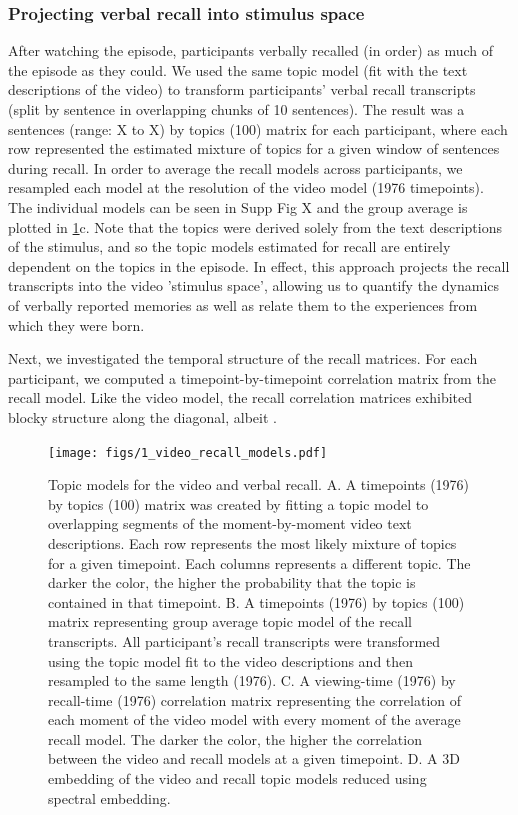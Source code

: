 \documentclass[a4paper,man,natbib,floatsintext]{apa6}
\begin{document}
\subsubsection{Projecting verbal recall into stimulus space}
After watching the episode, participants verbally recalled (in order) as much of the episode as they could.  We used the same topic model (fit with the text descriptions of the video) to transform participants' verbal recall transcripts (split by sentence in overlapping chunks of 10 sentences). The result was a sentences (range: X to X) by topics (100) matrix for each participant, where each row represented the estimated mixture of topics for a given window of sentences during recall. In order to average the recall models across participants, we resampled each model at the resolution of the video model (1976 timepoints). The individual models can be seen in Supp Fig X and the group average is plotted in \ref{fig:model}c. Note that the topics were derived solely from the text descriptions of the stimulus, and so the topic models estimated for recall are entirely dependent on the topics in the episode. In effect, this approach projects the recall transcripts into the video 'stimulus space', allowing us to quantify the dynamics of verbally reported memories as well as relate them to the experiences from which they were born.

Next, we investigated the temporal structure of the recall matrices. For each participant, we computed a timepoint-by-timepoint correlation matrix from the recall model. Like the video model, the recall correlation matrices exhibited blocky structure along the diagonal, albeit .

\begin{figure}[t!]
\centering
\texttt{[image: figs/1\_video\_recall\_models.pdf]}
\caption{\label{fig:model}Topic models for the video and verbal recall. A. A timepoints (1976) by topics (100) matrix was created by fitting a topic model to overlapping segments of the moment-by-moment video text descriptions.  Each row represents the most likely mixture of topics for a given timepoint. Each columns represents a different topic. The darker the color, the higher the probability that the topic is contained in that timepoint. B. A timepoints (1976) by topics (100) matrix representing group average topic model of the recall transcripts.  All participant's recall transcripts were transformed using the topic model fit to the video descriptions and then resampled to the same length (1976). C. A viewing-time (1976) by recall-time (1976) correlation matrix representing the correlation of each moment of the video model with every moment of the average recall model. The darker the color, the higher the correlation between the video and recall models at a given timepoint. D. A 3D embedding of the video and recall topic models reduced using spectral embedding. }
\end{figure}
\end{document}
